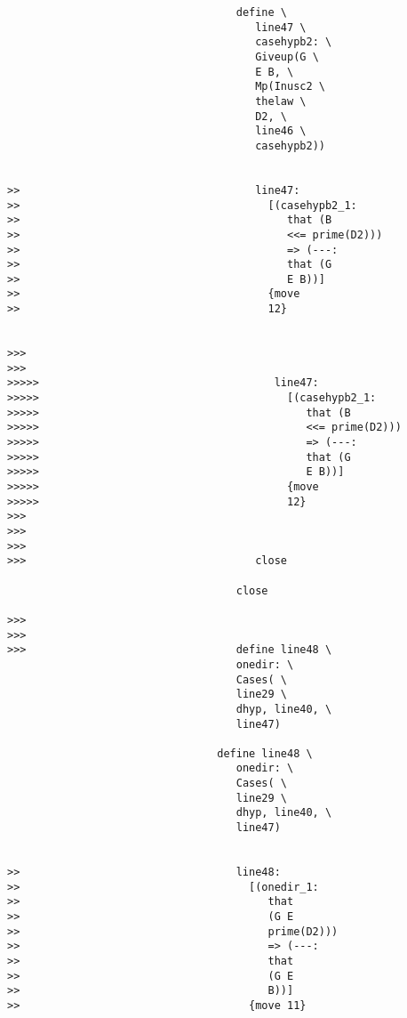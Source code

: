 \documentclass[12pt]{article}
\begin{document}
\begin{verbatim}
                                    define \
                                       line47 \
                                       casehypb2: \
                                       Giveup(G \
                                       E B, \
                                       Mp(Inusc2 \
                                       thelaw \
                                       D2, \
                                       line46 \
                                       casehypb2))


>>                                     line47:
>>                                       [(casehypb2_1:
>>                                          that (B
>>                                          <<= prime(D2)))
>>                                          => (---:
>>                                          that (G
>>                                          E B))]
>>                                       {move
>>                                       12}


>>>
>>>
>>>>>                                     line47:
>>>>>                                       [(casehypb2_1:
>>>>>                                          that (B
>>>>>                                          <<= prime(D2)))
>>>>>                                          => (---:
>>>>>                                          that (G
>>>>>                                          E B))]
>>>>>                                       {move
>>>>>                                       12}
>>>
>>>
>>>
>>>                                    close

                                    close

>>>
>>>
>>>                                 define line48 \
                                    onedir: \
                                    Cases( \
                                    line29 \
                                    dhyp, line40, \
                                    line47)

                                 define line48 \
                                    onedir: \
                                    Cases( \
                                    line29 \
                                    dhyp, line40, \
                                    line47)


>>                                  line48:
>>                                    [(onedir_1:
>>                                       that
>>                                       (G E
>>                                       prime(D2)))
>>                                       => (---:
>>                                       that
>>                                       (G E
>>                                       B))]
>>                                    {move 11}



\end{verbatim}
\end{document}
